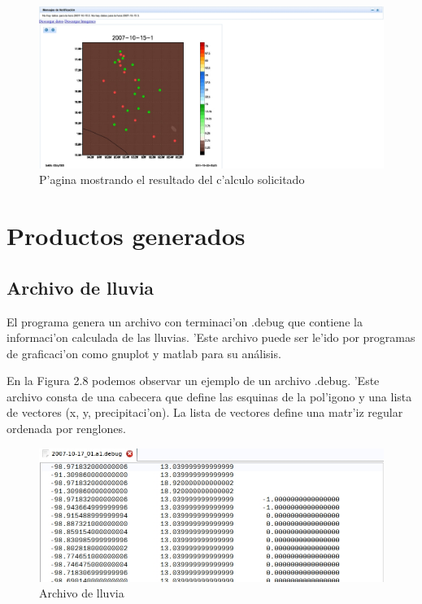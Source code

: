 \begin{figure}[h!]
 \centering
 \includegraphics[width=150mm]{./imagenes/ejemploPagina2.jpg}
 \caption{P'agina mostrando el resultado del c'alculo solicitado}
\end{figure}


\section{Productos generados}
\subsection{Archivo de lluvia}
El programa genera un archivo con terminaci'on .debug que contiene la informaci'on calculada de las lluvias.
'Este archivo puede ser le'ido por programas de graficaci'on como gnuplot y matlab para su análisis.

En la Figura 2.8 podemos observar un ejemplo de un archivo .debug. 'Este archivo
consta de una cabecera que define las esquinas de la pol'igono y una lista de vectores (x, y, precipitaci'on). La
lista de vectores define una matr'iz regular ordenada por renglones.

\begin{figure}[h!]
 \centering
 \includegraphics[width=150mm,bb=0 0 677 262]{./imagenes/archivodebug.jpg}
 \caption{Archivo de lluvia}
\end{figure}

